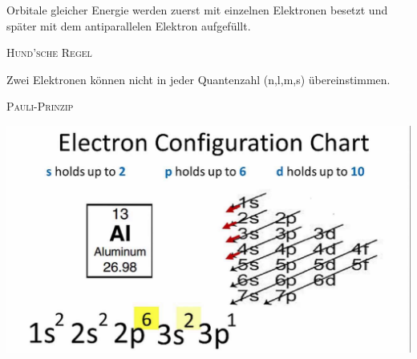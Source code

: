\documentclass[12pt,a4paper]{article}
\renewcommand{\=}[1]{\stackrel{#1}{=}}
\theoremstyle{definition}
\theoremstyle{remark}
\begin{document}
\begin{center}
\begin{minipage}[t]{.45\linewidth}
\vspace{0pt}

\begin{framed}
Orbitale gleicher Energie werden zuerst mit einzelnen Elektronen besetzt und später mit dem antiparallelen Elektron aufgefüllt.
\begin{center}
\textsc{Hund'sche Regel}
\end{center}
\end{framed}

\begin{framed}
Zwei Elektronen können nicht in jeder Quantenzahl (n,l,m,s) übereinstimmen.
\begin{center}
\textsc{Pauli-Prinzip}
\end{center}
\end{framed}

\includegraphics[width=\linewidth]{pic/econfig.jpg}

\end{minipage}%
\hspace{0.02\linewidth}
\begin{minipage}[t]{.50\linewidth}
\vspace{0pt}


\end{minipage}
\end{center}
\end{document}
